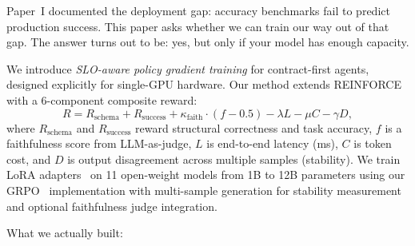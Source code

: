 \documentclass[11pt]{article}
\begin{document}
Paper~I documented the deployment gap: accuracy benchmarks fail to predict production success.  This paper asks whether we can train our way out of that gap.  The answer turns out to be: yes, but only if your model has enough capacity.

We introduce \emph{SLO-aware policy gradient training} for contract-first agents, designed explicitly for single-GPU hardware.
Our method extends REINFORCE~\citep{williams1992reinforce} with a 6-component composite reward:
\begin{equation}
R = R_{\text{schema}} + R_{\text{success}} + \kappa_{\text{faith}} \cdot (f - 0.5) - \lambda L - \mu C - \gamma D,
\end{equation}
where $R_{\text{schema}}$ and $R_{\text{success}}$ reward structural correctness and task accuracy,
$f$ is a faithfulness score from LLM-as-judge,
$L$ is end-to-end latency (ms), $C$ is token cost, and $D$ is output disagreement across multiple samples (stability).
We train LoRA adapters~\citep{hu2021lora,dettmers2023qlora} on 11 open-weight models from 1B to 12B parameters using our GRPO~\citep{grpo} implementation with multi-sample generation for stability measurement and optional faithfulness judge integration.

What we actually built:
\end{document}
